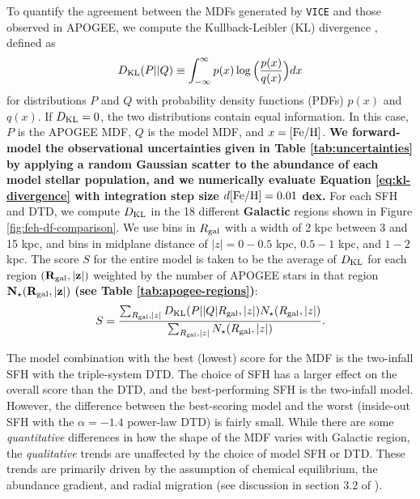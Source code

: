 \documentclass[twocolumn,twocolappendix,linenumbers]{aastex631}
\newcommand{\vice}{{\tt VICE}\xspace}
\begin{document}
To quantify the agreement between the MDFs generated by \vice and those observed in APOGEE, we compute the Kullback-Leibler (KL) divergence \citep{KullbackLeibler1951}, defined as
\begin{equation}
    D_{\rm{KL}}(P||Q) \equiv \int_{-\infty}^{\infty} p(x) \log\Big(\frac{p(x)}{q(x)}\Big) dx
    \label{eq:kl-divergence}
\end{equation}
for distributions $P$ and $Q$ with probability density functions (PDFs) $p(x)$ and $q(x)$. If $D_{\rm KL}=0$, the two distributions contain equal information. In this case, $P$ is the APOGEE MDF, $Q$ is the model MDF, and $x={\rm [Fe/H]}$. {\bf We forward-model the observational uncertainties given in Table \ref{tab:uncertainties} by applying a random Gaussian scatter to the abundance of each model stellar population, and we numerically evaluate Equation \ref{eq:kl-divergence} with integration step size $d{\rm [Fe/H]}=0.01$ dex.}
For each SFH and DTD, we compute $D_{\rm{KL}}$ in the 18 different {\bf Galactic} regions shown in Figure \ref{fig:feh-df-comparison}. We use bins in $R_{\rm gal}$ with a width of 2 kpc between 3 and 15 kpc, and bins in midplane distance of $|z|=0-0.5$ kpc, $0.5-1$ kpc, and $1-2$ kpc. The score $S$ for the entire model is taken to be the average of $D_{\rm{KL}}$ for each region $\bf (R_{\rm gal}, |z|)$ weighted by the number of APOGEE stars in that region $\bf N_\star(R_{\rm gal}, |z|)$ {\bf (see Table \ref{tab:apogee-regions})}:
\begin{equation}
    S = \frac{\sum_{R_{\rm gal}, |z|} D_{\rm KL}(P||Q|R_{\rm gal}, |z|) N_\star(R_{\rm gal}, |z|)}{\sum_{R_{\rm gal}, |z|} N_\star(R_{\rm gal}, |z|)}.
    \label{eq:feh-df-score}
\end{equation}

The model combination with the best (lowest) score for the MDF is the two-infall SFH with the triple-system DTD. The choice of SFH has a larger effect on the overall score than the DTD, and the best-performing SFH is the two-infall model. However, the difference between the best-scoring model and the worst (inside-out SFH with the $\alpha=-1.4$ power-law DTD) is fairly small. While there are some {\it quantitative} differences in how the shape of the MDF varies with Galactic region, the {\it qualitative} trends are unaffected by the choice of model SFH or DTD. These trends are primarily driven by the assumption of chemical equilibrium, the abundance gradient, and radial migration (see discussion in section 3.2 of ).
\end{document}

